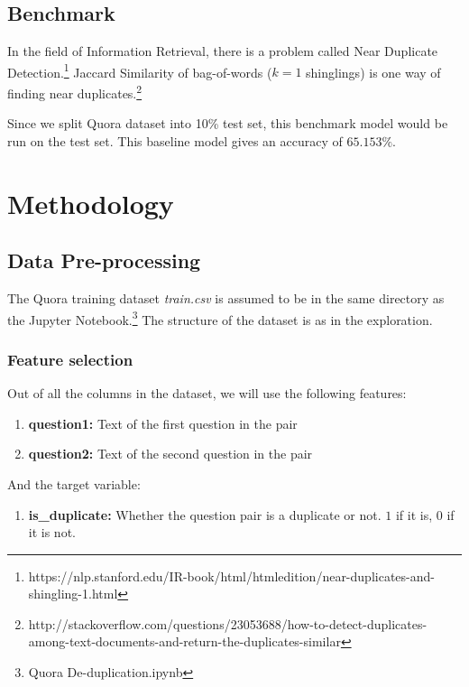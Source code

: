 \documentclass{article}
\begin{document}
\subsection{Benchmark}

In the field of Information Retrieval, there is a problem called Near Duplicate Detection.\footnote{https://nlp.stanford.edu/IR-book/html/htmledition/near-duplicates-and-shingling-1.html} Jaccard Similarity of bag-of-words ($k=1$ shinglings) is one way of finding near duplicates.\footnote{http://stackoverflow.com/questions/23053688/how-to-detect-duplicates-among-text-documents-and-return-the-duplicates-similar}

Since we split Quora dataset into 10\% test set, this benchmark model would be run on the test set. This baseline model gives an accuracy of $65.153\%$.


\section{Methodology}

\subsection{Data Pre-processing}

The Quora training dataset \textit{train.csv} is assumed to be in the same directory as the Jupyter Notebook.\footnote{Quora De-duplication.ipynb} The structure of the dataset is as in the exploration.

\subsubsection{Feature selection}

Out of all the columns in the dataset, we will use the following features:

\begin{enumerate}
\item{\textbf{question1:} Text of the first question in the pair}
\item{\textbf{question2:} Text of the second question in the pair}
\end{enumerate}

\noindent And the target variable:

\begin{enumerate}
\item{\textbf{is\_duplicate:} Whether the question pair is a duplicate or not. $1$ if it is, $0$ if it is not.}
\end{enumerate}
\end{document}
